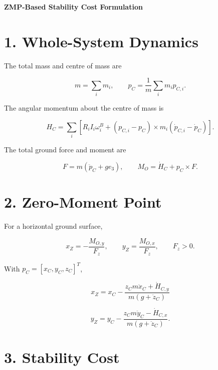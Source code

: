 \documentclass[10pt]{article}
\begin{document}
\begin{center}
{\Large\textbf{ZMP-Based Stability Cost Formulation}}
\end{center}

\section*{1. Whole-System Dynamics}

The total mass and centre of mass are

\begin{equation}
m=\sum_i m_i,
\qquad
p_C=\frac{1}{m}\sum_i m_i p_{C,i}.
\end{equation}

The angular momentum about the centre of mass is

\begin{equation}
H_C=
\sum_i
\left[
R_iI_i\omega_i^B+
(p_{C,i}-p_C)\times m_i(\dot p_{C,i}-\dot p_C)
\right].
\end{equation}

The total ground force and moment are

\begin{equation}
F=m(\ddot p_C+ge_3),
\qquad
M_O=\dot H_C+p_C\times F.
\end{equation}

\section*{2. Zero-Moment Point}

For a horizontal ground surface,

\begin{equation}
x_Z=-\frac{M_{O,y}}{F_z},
\qquad
y_Z=\frac{M_{O,x}}{F_z},
\qquad F_z>0.
\end{equation}

With $p_C=[x_C,y_C,z_C]^T$,

\begin{equation}
\boxed{
x_Z=
x_C-
\frac{z_Cm\ddot x_C+\dot H_{C,y}}
{m(g+\ddot z_C)}
}
\end{equation}

\begin{equation}
\boxed{
y_Z=
y_C-
\frac{z_Cm\ddot y_C-\dot H_{C,x}}
{m(g+\ddot z_C)}
}.
\end{equation}

\section*{3. Stability Cost}
\end{document}
